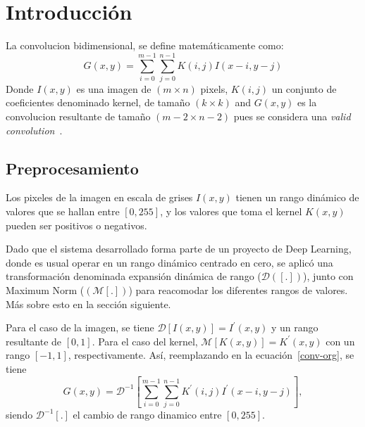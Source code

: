 \chapter{Introducción}\label{intro_secc}

La convolucion bidimensional, se define matemáticamente como:
\begin{equation}\label{conv-org}
  G(x,y) = \sum_{i=0}^{m-1} \sum_{j=0}^{n-1}K(i,j)I(x-i,y-j)
\end{equation}
Donde $I(x,y)$ es una imagen de $(m \times n)$ pixels, $K(i,j)$ un conjunto de
coeficientes denominado kernel, de tamaño $(k \times k)$ and $G(x,y)$ es la
convolucion resultante de tamaño  $(m-2 \times n-2)$ pues se considera una
\textit{valid convolution}~\cite{validconv}. 

\section{Preprocesamiento}\label{dynamicrange}

Los pixeles de la imagen en escala de grises $I(x,y)$ tienen un rango dinámico
de valores que se hallan entre $[0,255]$, y los valores que toma el kernel
$K(x,y)$ pueden ser positivos o negativos.

Dado que el sistema desarrollado forma parte de un proyecto de Deep Learning,
donde es usual operar en un rango dinámico centrado en cero, se aplicó una
transformación denominada  expansión dinámica de rango\cite{dinamic_rango} ($\mathcal{D}([.])$),
junto con Maximum Norm\cite{max_norm} ($(\mathcal{M}[.])$) para reacomodar los diferentes 
rangos de valores. Más sobre esto en la sección siguiente.

Para el caso de la imagen, se tiene $\mathcal{D}[I(x,y)]=I^\prime(x,y)$ y un
rango resultante de $[0,1]$. Para el caso del kernel,
$\mathcal{M}[K(x,y)]=K^\prime(x,y)$ con un rango $[-1,1]$, respectivamente.
Así, reemplazando en la ecuación~\ref{conv-org}, se tiene 
\begin{equation}\label{conv-org1}
  G(x,y) = \mathcal{D}^{-1}\left[\sum_{i=0}^{m-1} \sum_{j=0}^{n-1}K^\prime(i,j)I^\prime(x-i,y-j)\right],
\end{equation}
siendo $\mathcal{D}^{-1}[.]$ el cambio de rango dinamico entre $[0,255]$.

